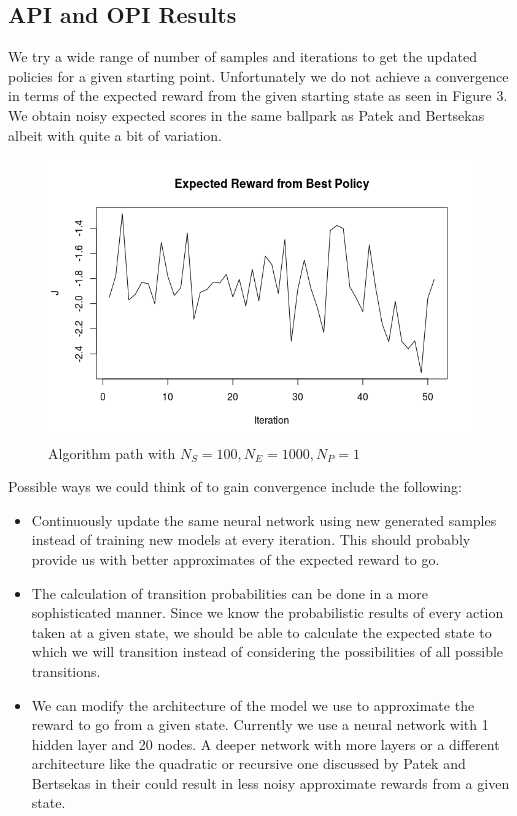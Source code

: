\documentclass[11pt, oneside]{article}   	%
\begin{document}
\subsection{API and OPI Results}
We try a wide range of number of samples and iterations to get the updated policies for a given starting point. Unfortunately we do not achieve a convergence in terms of the expected reward from the given starting state as seen in Figure 3. We obtain noisy expected scores in the same ballpark as Patek and Bertsekas albeit with quite a bit of variation.

\begin{figure}[ht!]
\centering
\includegraphics[width=155mm]{../images/plot.png}
\caption{Algorithm path with $N_S=100, N_E=1000, N_P=1$}
\end{figure}

Possible ways we could think of to gain convergence include the following:
\begin{itemize}
	\item Continuously update the same neural network using new generated samples instead of training new models at every iteration. This should probably provide us with better approximates of the expected reward to go.
	\item The calculation of transition probabilities can be done in a more sophisticated manner. Since we know the probabilistic results of every action taken at a given state, we should be able to calculate the expected state to which we will transition instead of considering the possibilities of all possible transitions.
	\item We can modify the architecture of the model we use to approximate the reward to go from a given state. Currently we use a neural network with 1 hidden layer and 20 nodes. A deeper network with more layers or a different architecture like the quadratic or recursive one discussed by Patek and Bertsekas in their could result in less noisy approximate rewards from a given state.
\end{itemize}
\end{document}

